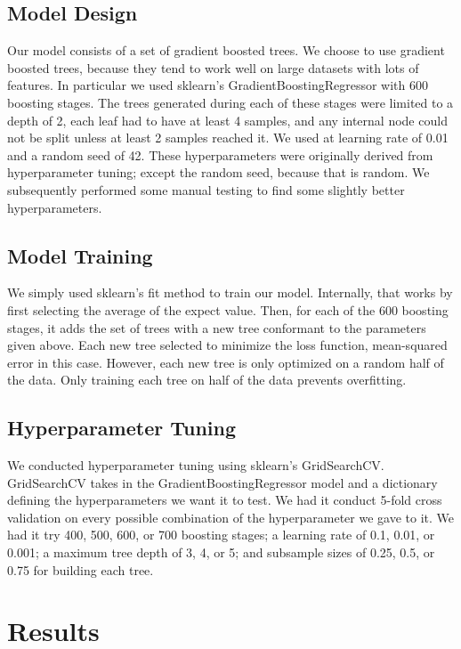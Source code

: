\documentclass{article}
\begin{document}
\subsection{Model Design}

Our model consists of a set of gradient boosted trees. We choose to use gradient boosted trees, because they tend to work well on large datasets with lots of features. In particular we used sklearn's GradientBoostingRegressor with 600 boosting stages. The trees generated during each of these stages were limited to a depth of 2, each leaf had to have at least 4 samples, and any internal node could not be split unless at least 2 samples reached it. We used at learning rate of 0.01 and a random seed of 42. These hyperparameters were originally derived from hyperparameter tuning; except the random seed, because that is random. We subsequently performed some manual testing to find some slightly better hyperparameters. 

\subsection{Model Training}

We simply used sklearn's fit method to train our model. Internally, that works by first selecting the average of the expect value. Then, for each of the 600 boosting stages, it adds the set of trees with a new tree conformant to the parameters given above. Each new tree selected to minimize the loss function, mean-squared error in this case. However, each new tree is only optimized on a random half of the data. Only training each tree on half of the data prevents overfitting. 

\subsection{Hyperparameter Tuning}

We conducted hyperparameter tuning using sklearn's GridSearchCV. GridSearchCV takes in the GradientBoostingRegressor model and a dictionary defining the hyperparameters we want it to test. We had it conduct 5-fold cross validation on every possible combination of the hyperparameter we gave to it. We had it try 400, 500, 600, or 700 boosting stages; a learning rate of 0.1, 0.01, or 0.001; a maximum tree depth of 3, 4, or 5; and subsample sizes of 0.25, 0.5, or 0.75 for building each tree. 

\section{Results}
\end{document}
